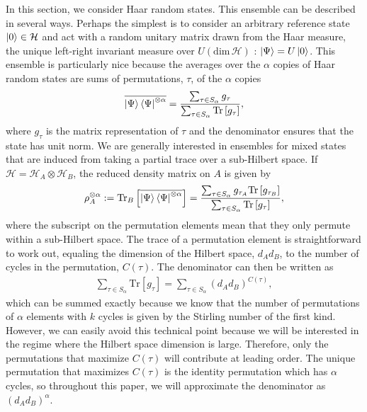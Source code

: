 \documentclass[a4paper,11pt]{article}
\newcommand{\Tr}{\text{Tr}}
\newcommand*{\SR}[1]{\textcolor{magenta}{[SR: \textsf{#1}]}}
\begin{document}
In this section, we consider Haar random states. This ensemble can be described in several ways. Perhaps the simplest is to consider an arbitrary reference state $\ket{0} \in \mathcal{H}$ and act with a random unitary matrix drawn from the Haar measure, the unique left-right invariant measure over $U(\mathrm{dim}\, \mathcal{H})$
: $\ket{\Psi }= U\ket{0}$. This ensemble is particularly nice because the averages over the $\alpha$ copies of Haar random states are sums of permutations, $\tau$, of the $\alpha$ copies
\begin{align}
    \overline{\ket{\Psi}\bra{\Psi}^{\otimes \alpha}} = \frac{\sum_{\tau \in S_\alpha} g_{\tau}}{\sum_{\tau \in S_\alpha} \Tr\left[g_\tau\right]},
    \label{haar_avg}
\end{align}
where $g_{\tau}$ is the matrix representation of $\tau$ and the denominator ensures that the state has unit norm. We are generally interested in ensembles for mixed states that are induced from taking a partial trace over a sub-Hilbert space. If $\mathcal{H} = \mathcal{H}_A \otimes \mathcal{H}_B$, the reduced density matrix on $A$ is given by
\begin{align}
    \rho_A^{\otimes \alpha} := \Tr_B\left[\overline{\ket{\Psi}\bra{\Psi}^{\otimes \alpha}}\right] = \frac{\sum_{\tau \in S_\alpha} g_{\tau_A} \Tr\left[ g_{\tau_B}\right]}{\sum_{\tau \in S_\alpha} \Tr\left[g_{\tau}\right]},
    \label{haar_avg_dens}
\end{align}
where the subscript on the permutation elements mean that they only permute within
a sub-Hilbert space. The trace of a permutation element is straightforward to work out, equaling the dimension of the Hilbert space, $d_A d_B$, to the number of cycles in the permutation, $C(\tau)$. The denominator can then be written as
\begin{align}
    \sum_{\tau \in S_\alpha} \Tr\left[g_{\tau}\right] = \sum_{\tau \in S_\alpha} \left(d_A d_B\right)^{C(\tau)},
    \label{normalization_haar}
\end{align}
which can be summed exactly because we know that the number of permutations of $\alpha$ elements with $k$ cycles is given by the Stirling number of the first kind. However, we can easily avoid this technical point because we will be interested in the regime where the Hilbert space dimension is large. Therefore, only the permutations that maximize $C(\tau)$ will contribute at leading order. The unique permutation that maximizes $C(\tau)$ is the identity permutation which has $\alpha$ cycles, so throughout this paper, we will approximate the denominator as $(d_A d_B)^\alpha$.
\end{document}
